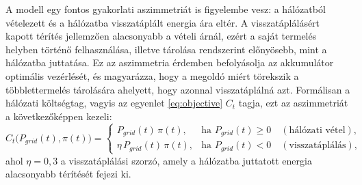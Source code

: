 A modell egy fontos gyakorlati aszimmetriát is figyelembe vesz: a hálózatból vételezett és a hálózatba visszatáplált energia ára eltér. A visszatáplálásért kapott térítés jellemzően alacsonyabb a vételi árnál, ezért a saját termelés helyben történő felhasználása, illetve tárolása rendszerint előnyösebb, mint a hálózatba juttatása. Ez az aszimmetria érdemben befolyásolja az akkumulátor optimális vezérlését, és magyarázza, hogy a megoldó miért törekszik a többlettermelés tárolására ahelyett, hogy azonnal visszatáplálná azt. Formálisan a hálózati költségtag, vagyis az egyenlet \eqref{eq:objective} $C_t$ tagja, ezt az aszimmetriát a következőképpen kezeli:
\begin{equation}
C_t\bigl(P_{grid}(t),\pi(t)\bigr) =
\begin{cases}
P_{grid}(t)\,\pi(t), & \text{ha } P_{grid}(t) \ge 0 \quad (\text{hálózati vétel}),\\[2pt]
\eta\,P_{grid}(t)\,\pi(t), & \text{ha } P_{grid}(t) < 0 \quad (\text{visszatáplálás}),
\end{cases}
\end{equation}
ahol $\eta=0{,}3$ a visszatáplálási szorzó, amely a hálózatba juttatott energia alacsonyabb térítését fejezi ki.
